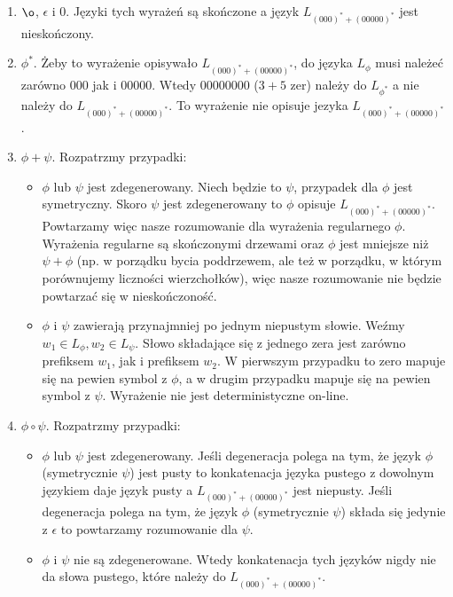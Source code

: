 \documentclass[a4paper]{article}
\begin{document}
\begin{enumerate}
\item $\o$, $\epsilon$ i $0$. Języki tych wyrażeń są skończone a język $L_{(000)^* + (00000)^*}$ jest nieskończony.
\item $\phi^*$. Żeby to wyrażenie opisywało $L_{(000)^* + (00000)^*}$, do języka $L_{\phi}$ musi należeć zarówno $000$ jak i $00000$. Wtedy $00000000$ ($3+5$ zer) należy do $L_{\phi^*}$ a nie należy do $L_{(000)^* + (00000)^*}$. To wyrażenie nie opisuje jezyka $L_{(000)^* + (00000)^*}$.
\item $\phi + \psi$. Rozpatrzmy przypadki:
  \begin{itemize}
    \item $\phi$ lub $\psi$ jest zdegenerowany. Niech będzie to $\psi$, przypadek dla $\phi$ jest symetryczny. Skoro $\psi$ jest zdegenerowany to $\phi$ opisuje $L_{(000)^* + (00000)^*}$. Powtarzamy więc nasze rozumowanie dla wyrażenia regularnego $\phi$. Wyrażenia regularne są skończonymi drzewami oraz $\phi$ jest mniejsze niż $\psi + \phi$ (np. w porządku bycia poddrzewem, ale też w porządku, w którym porównujemy liczności wierzchołków), więc nasze rozumowanie nie będzie powtarzać się w nieskończoność.
    \item $\phi$ i $\psi$ zawierają przynajmniej po jednym niepustym słowie. Weźmy $w_1 \in L_{\phi}, w_2 \in L_{\psi}$. Słowo składające się z jednego zera jest zarówno prefiksem $w_1$, jak i prefiksem $w_2$. W pierwszym przypadku to zero mapuje się na pewien symbol z $\phi$, a w drugim przypadku mapuje się na pewien symbol z $\psi$. Wyrażenie nie jest deterministyczne on-line.
  \end{itemize}
\item $\phi \circ \psi$. Rozpatrzmy przypadki:
  \begin{itemize}
  \item $\phi$ lub $\psi$ jest zdegenerowany. Jeśli degeneracja polega na tym, że język $\phi$ (symetrycznie $\psi$) jest pusty to konkatenacja języka pustego z dowolnym językiem daje język pusty a $L_{(000)^* + (00000)^*}$ jest niepusty. Jeśli degeneracja polega na tym, że język $\phi$ (symetrycznie $\psi$) składa się jedynie z $\epsilon$ to powtarzamy rozumowanie dla $\psi$.
    \item $\phi$ i $\psi$ nie są zdegenerowane. Wtedy konkatenacja tych języków nigdy nie da słowa pustego, które należy do $L_{(000)^* + (00000)^*}$.
  \end{itemize}
\end{enumerate}
\end{document}
